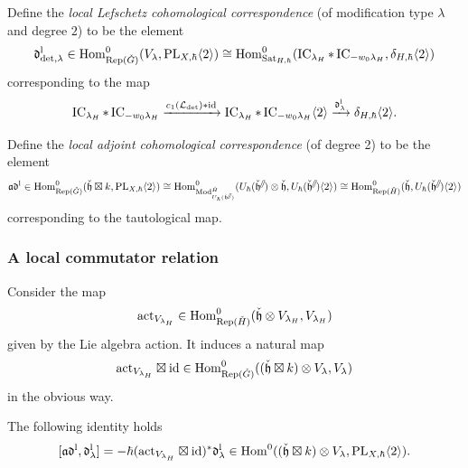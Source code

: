 \documentclass[reqno]{amsart}
\numberwithin{equation}{section}
\numberwithin{equation}{section}
\begin{document}
Define the \emph{local Lefschetz cohomological correspondence} (of modification type $\lambda$ and degree $2$) to be the element 
\begin{equation}\label{eq:lefcorloc}
    \mathfrak{d}_{\det,\lambda}^{\mathrm{l}}\in \operatorname{Hom}^0_{\operatorname{Rep}(\check{G})}(V_{\lambda},\mathrm{PL}_{X,\hbar}\langle 2\rangle) \cong \operatorname{Hom}^0_{\operatorname{Sat}_{H,\hbar}}(\operatorname{IC}_{\lambda_H}*\operatorname{IC}_{-w_0\lambda_H},\delta_{H,\hbar}\langle 2\rangle)
\end{equation} corresponding to the map \[\operatorname{IC}_{\lambda_H}*\operatorname{IC}_{-w_0\lambda_H}\xrightarrow{c_1(\mathcal{L}_{\det})*\mathrm{id}} \operatorname{IC}_{\lambda_H}*\operatorname{IC}_{-w_0\lambda_H}\langle 2\rangle \xrightarrow{\mathfrak{d}_{\lambda}^{\mathrm{l}}} \delta_{H,\hbar}\langle 2\rangle.\]


Define the \emph{local adjoint cohomological correspondence} (of degree 2) to be the element \begin{equation}
    \mathfrak{a}\mathfrak{d}^{\mathrm{l}} 
    \in \operatorname{Hom}^0_{\operatorname{Rep}(\check{G})}(\check{\mathfrak{h}}\boxtimes k, \mathrm{PL}_{X,\hbar}\langle 2\rangle)
    \cong \operatorname{Hom}^0_{\mathrm{Mod}_{U_{\hbar}(\check{\mathfrak{h}}^{{\mathbin{\mkern-6mu\fatslash}}})}^{\check{H}}}( U_{\hbar}(\check{\mathfrak{h}}^{{\mathbin{\mkern-6mu\fatslash}}})\otimes \check{\mathfrak{h}},U_{\hbar}(\check{\mathfrak{h}}^{{\mathbin{\mkern-6mu\fatslash}}})\langle 2\rangle)\cong \operatorname{Hom}^0_{\operatorname{Rep}(\check{H})}(\check{\mathfrak{h}}, U_{\hbar}(\check{\mathfrak{h}}^{{\mathbin{\mkern-6mu\fatslash}}})\langle 2\rangle) \end{equation} corresponding to the tautological map.

\subsubsection{A local commutator relation}

Consider the map \begin{equation}\mathrm{act}_{V_{\lambda_H}}\in \operatorname{Hom}^0_{\operatorname{Rep}(\check{H})}(\check{\mathfrak{h}}\otimes V_{\lambda_H} ,V_{\lambda_H})\end{equation} given by the Lie algebra action. It induces a natural map \begin{equation}
    \mathrm{act}_{V_{\lambda_H}}\boxtimes \mathrm{id} \in \operatorname{Hom}^0_{\operatorname{Rep}(\check{G})}((\check{\mathfrak{h}}\boxtimes k)\otimes V_{\lambda},V_{\lambda})
\end{equation} in the obvious way.

\begin{prop}\label{prop:localcommutator}
    The following identity holds \[[\mathfrak{a}\mathfrak{d}^{\mathrm{l}},\mathfrak{d}_{\lambda}^{\mathrm{l}}]=-\hbar (\mathrm{act}_{V_{\lambda_H}}\boxtimes \mathrm{id})^*\mathfrak{d}_{\lambda}^{\mathrm{l}}\in\operatorname{Hom}^0((\check{\mathfrak{h}}\boxtimes k)\otimes V_{\lambda},\mathrm{PL}_{X,\hbar}\langle 2\rangle).\]
\end{prop}
\end{document}
